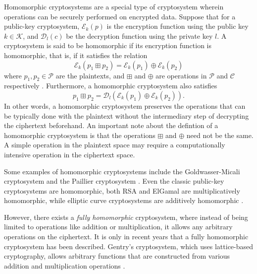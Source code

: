 Homomorphic cryptosystems are a special type of cryptosystem wherein operations can be securely performed on encrypted data. Suppose that for a public-key cryptosystem, $\mathcal{E}_k \left(p \right)$ is the encryption function using the public key $k \in \mathcal{K}$, and $\mathcal{D}_l \left(c \right)$ be the decryption function using the private key $l$. A cryptosystem is said to be homomorphic if its encryption function is homomorphic, that is, if it satisfies the relation
\begin{equation}
    \mathcal{E}_k \left(p_1 \boxplus p_2\right) = \mathcal{E}_k \left(p_1\right) \oplus \mathcal{E}_k \left(p_2\right)
\end{equation}
where $p_1, p_2 \in \mathcal{P}$ are the plaintexts, and $\boxplus$ and $\oplus$ are operations in $\mathcal{P}$ and $\mathcal{C}$ respectively \cite{fontaine_survey_2007}. Furthermore, a homomorphic cryptosystem also satisfies \cite{li_elliptic_2012}
\begin{equation}
    p_1 \boxplus p_2 = \mathcal{D}_l \left( \mathcal{E}_k \left(p_1\right) \oplus \mathcal{E}_k \left(p_2\right) \right).
\end{equation}
In other words, a homomorphic cryptosystem preserves the operations that can be typically done with the plaintext without the intermediary step of decrypting the ciphertext beforehand. An important note about the defintion of a homomorphic cryptosystem is that the operations $\boxplus$ and $\oplus$ need not be the same. A simple operation in the plaintext space may require a computationally intensive operation in the ciphertext space.

Some examples of homomorphic cryptosystems include the Goldwasser-Micali cryptosystem \cite{goldwasser_probabilistic_1984} and the Paillier cryptosystem \cite{stern_public-key_1999}. Even the classic public-key cryptosystems are homomorphic, both RSA and ElGamal are multiplicatively homomorphic, while elliptic curve cryptosystems are additively homomorphic \cite{li_elliptic_2012}.

However, there exists a \textit{fully homomorphic} cryptosystem, where instead of being limited to operations like addition or multiplication, it allows any arbitrary operations on the ciphertext. It is only in recent years that a fully homomorphic cryptosystem has been described. Gentry's cryptosystem, which uses lattice-based cryptography, allows arbitrary functions that are constructed from various addition and multiplication operations \cite{gentry_fully_2009}.


